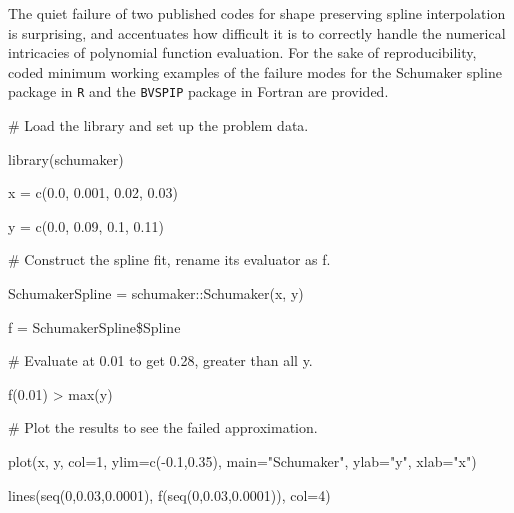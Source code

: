 \vfil\break


The quiet failure of two published codes for shape
preserving spline interpolation is surprising, and accentuates how
difficult it is to correctly handle the numerical intricacies of
polynomial function evaluation. For the sake of reproducibility, coded
minimum working examples of the failure modes for the Schumaker spline
package in {\tt R} and the {\tt BVSPIP} package in Fortran are
provided.

\vskip 5mm


\vskip 3mm

{\parskip=-1pt \parindent=10pt \ttVIII
\item{} \textMaroon \# Load the library and set up the problem data. \textBlack
\item{} library(schumaker)
\item{} x = c(0.0, 0.001, 0.02, 0.03)
\item{} y = c(0.0, 0.09, 0.1, 0.11)
\item{} \textMaroon \# Construct the spline fit, rename its evaluator as {}f{}. \textBlack
\item{} SchumakerSpline = schumaker::Schumaker(x, y)
\item{} f = SchumakerSpline\$Spline
\item{} \textMaroon \# Evaluate at 0.01 to get 0.28, greater than all {}y{}. \textBlack
\item{} f(0.01) > max(y)
\item{} \textMaroon \# Plot the results to see the failed approximation. \textBlack
\item{} plot(x, y, col=1, ylim=c(-0.1,0.35), main="Schumaker", ylab="y", xlab="x")
\item{} lines(seq(0,0.03,0.0001), f(seq(0,0.03,0.0001)), col=4)
}

\vskip 5mm


\vskip 3mm

